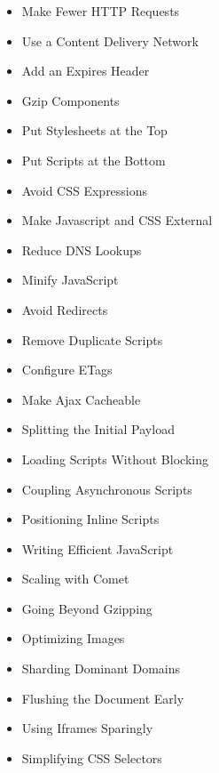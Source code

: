 \begin{itemize}
\item Make Fewer HTTP Requests
\item Use a Content Delivery Network
\item Add an Expires Header
\item Gzip Components
\item Put Stylesheets at the Top
\item Put Scripts at the Bottom
\item Avoid CSS Expressions
\item Make Javascript and CSS External
\item Reduce DNS Lookups
\item Minify JavaScript
\item Avoid Redirects
\item Remove Duplicate Scripts
\item Configure ETags
\item Make Ajax Cacheable
\item Splitting the Initial Payload
\item Loading Scripts Without Blocking
\item Coupling Asynchronous Scripts
\item Positioning Inline Scripts
\item Writing Efficient JavaScript
\item Scaling with Comet
\item Going Beyond Gzipping
\item Optimizing Images
\item Sharding Dominant Domains
\item Flushing the Document Early
\item Using Iframes Sparingly
\item Simplifying CSS Selectors
\end{itemize}
